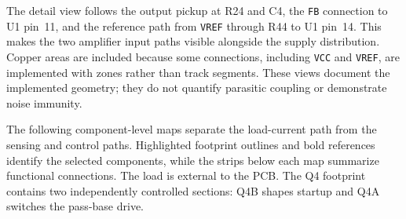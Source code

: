 \documentclass[conference]{IEEEtran}
\begin{document}
The detail view follows the output pickup at R24 and C4, the
\texttt{FB} connection to U1 pin~11, and the reference path from
\texttt{VREF} through R44 to U1 pin~14. This makes the two amplifier
input paths visible alongside the supply distribution. Copper areas
are included because some connections, including \texttt{VCC} and
\texttt{VREF}, are implemented with zones rather than track segments.
These views document the implemented geometry; they do not quantify
parasitic coupling or demonstrate noise immunity.

The following component-level maps separate the load-current path from
the sensing and control paths. Highlighted footprint outlines and bold
references identify the selected components, while the strips below each
map summarize functional connections.
The load is external to the PCB. The Q4 footprint contains two independently
controlled sections: Q4B shapes startup and Q4A switches the pass-base drive.
\end{document}
